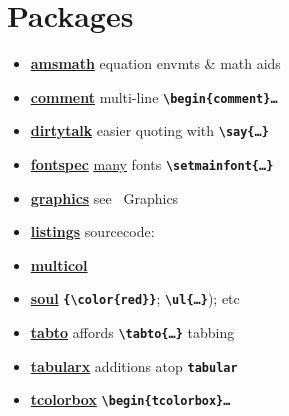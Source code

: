 \section{Packages}


\begin{itemize}[label=-,leftmargin=*]
    \item \textbf{\href{http://mirrors.ctan.org/macros/latex/required/amsmath/amsldoc.pdf}{amsmath}} \tabto*{15mm} equation envmts \& math aids
    \item \textbf{\href{http://mirrors.ctan.org/macros/latex/contrib/comment/comment.pdf}{comment}} \tabto*{15mm} multi-line {\tt\bf \textbackslash begin\{comment\}\dots}
    \item \textbf{\href{http://mirrors.ctan.org/macros/latex/contrib/dirtytalk/dirtytalk.pdf}{dirtytalk}} \tabto*{15mm} easier quoting with {\tt\bf \textbackslash say\{\dots\}}
    \item \textbf{\href{http://mirrors.ctan.org/macros/unicodetex/latex/fontspec/fontspec.pdf}{fontspec}} \tabto*{15mm} \href{https://tug.org/FontCatalogue/}{\ul{many}} fonts {\tt\bf\textbackslash setmainfont\{\dots\}}
    \item \textbf{\href{http://mirrors.ctan.org/macros/latex/required/graphics/graphics.pdf}{graphics}} \tabto*{15mm} see \textsection\ Graphics
    \item \textbf{\href{http://mirrors.ctan.org/macros/latex/contrib/listings/listings.pdf}{listings}} \tabto*{15mm} sourcecode: 
    \item \textbf{\href{http://mirrors.ctan.org/macros/latex/required/tools/multicol.pdf}{multicol}} \tabto*{15mm} 
    \item \textbf{\href{http://mirrors.ctan.org/macros/generic/soul/soul.pdf}{soul}} \tabto*{15mm} {\tt\bf \{\textbackslash color\{red\}\}}; {\tt\bf \textbackslash ul\{\dots\}}); etc
    \item \textbf{\href{http://mirrors.ctan.org/macros/latex/contrib/tabto/tabto-doc.pdf}{tabto}} \tabto*{15mm} affords {\tt\bf \textbackslash tabto\{\dots\}} tabbing
    \item \textbf{\href{http://mirrors.ctan.org/macros/latex/required/tools/tabularx.pdf}{tabularx}} \tabto*{15mm} additions atop {\tt\bf tabular}
    \item \textbf{\href{https://www.overleaf.com/latex/examples/drawing-coloured-boxes-using-tcolorbox/pvknncpjyfbp}{tcolorbox}} \tabto*{15mm} {\tt\bf\textbackslash begin\{tcolorbox\}\dots} 

\end{itemize}
